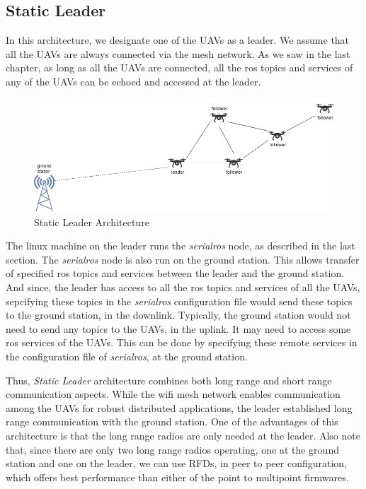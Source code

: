 \subsection{Static Leader}
In this architecture, we designate one of the UAVs as a leader. We assume that all the UAVs are always connected via the mesh network. As we saw in the last chapter, as long as all the UAVs are connected, all the ros topics and services of any of the UAVs can be echoed and accessed at the leader.

\begin{figure}[h]
	\centering
	\includegraphics[scale=0.5]{Pictures/staticLeader.png}
	\caption{Static Leader Architecture}
	\label{fig: staticLeader}
\end{figure}

The linux machine on the leader runs the \textit{serialros} node, as described in the last section. The \textit{serialros} node is also run on the ground station. This allows transfer of specified ros topics and services between the leader and the ground station. And since, the leader has access to all the ros topics and services of all the UAVs, sepcifying these topics in the \textit{serialros} configuration file would send these topics to the ground station, in the downlink. Typically, the ground station would not need to send any topics to the UAVs, in the uplink. It may need to access some ros services of the UAVs. This can be done by specifying these remote services in the configuration file of \textit{serialros}, at the ground station.

Thus, \textit{Static Leader} architecture combines both long range and short range communication aspects. While the wifi mesh network enables communication among the UAVs for robust distributed applications, the leader established long range communication with the ground station. One of the advantages of this architecture is that the long range radios are only needed at the leader. Also note that, since there are only two long range radios operating, one at the ground station and one on the leader, we can use RFDs, in peer to peer configuration, which offers best performance than either of the point to multipoint firmwares.

